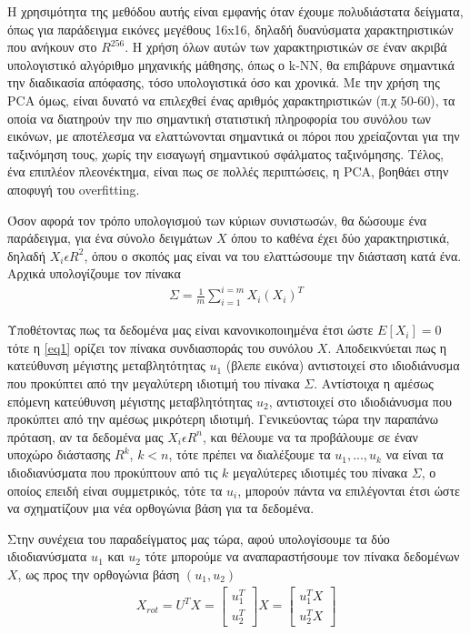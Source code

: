 \documentclass[11pt,a4paper,english,greek,twoside]{../Thesis}
\begin{document}
\par Η χρησιμότητα της μεθόδου αυτής είναι εμφανής όταν έχουμε πολυδιάστατα δείγματα, όπως για παράδειγμα εικόνες  μεγέθους 16x16, δηλαδή δυανύσματα χαρακτηριστικών που ανήκουν στο $R^{256}$. Η χρήση όλων αυτών των χαρακτηριστικών σε έναν ακριβά υπολογιστικό αλγόριθμο μηχανικής μάθησης, όπως ο k-NN, θα επιβάρυνε σημαντικά την διαδικασία απόφασης, τόσο υπολογιστικά όσο και χρονικά. Με την χρήση της PCA όμως, είναι δυνατό να επιλεχθεί ένας αριθμός χαρακτηριστικών (π.χ 50-60), τα οποία να διατηρούν την πιο σημαντική στατιστική πληροφορία του συνόλου των εικόνων, με αποτέλεσμα να ελαττώνονται σημαντικά οι πόροι που χρείαζονται για την ταξινόμηση τους, χωρίς την εισαγωγή σημαντικού σφάλματος ταξινόμησης. Τέλος, ένα επιπλέον πλεονέκτημα, είναι πως σε πολλές περιπτώσεις, η PCA, βοηθάει στην αποφυγή του overfitting.

\par Όσον αφορά τον τρόπο υπολογισμού των κύριων συνιστωσών, θα δώσουμε ένα παράδειγμα, για ένα σύνολο δειγμάτων $X$ όπου το καθένα έχει δύο χαρακτηριστικά, δηλαδή $X_i \epsilon R^2$, όπου ο σκοπός μας είναι να του ελαττώσουμε την διάσταση κατά ένα. Αρχικά υπολογίζουμε τον πίνακα 
\begin{align}
\Sigma = \frac{1}{m}\sum_{i=1}^{i=m} X_i(X_i)^T \label{eq1}
\end{align}

\par Υποθέτοντας πως τα δεδομένα μας είναι κανονικοποιημένα έτσι ώστε $E[X_i]=0$ τότε η \eqref{eq1} ορίζει τον πίνακα συνδιασποράς του συνόλου $X$. Αποδεικνύεται πως η κατεύθυνση μέγιστης μεταβλητότητας $u_1$ (βλεπε εικόνα) αντιστοιχεί στο ιδιοδιάνυσμα που προκύπτει από την μεγαλύτερη ιδιοτιμή του πίνακα $\Sigma$. Αντίστοιχα η αμέσως επόμενη κατεύθυνση μέγιστης μεταβλητότητας $u_2$, αντιστοιχεί στο ιδιοδιάνυσμα που προκύπτει από την αμέσως μικρότερη ιδιοτιμή. Γενικεύοντας τώρα την παραπάνω πρόταση, αν τα δεδομένα μας $X_i \epsilon R^n$, και θέλουμε να τα προβάλουμε σε έναν υποχώρο διάστασης $R^k$, $k<n$, τότε πρέπει να διαλέξουμε τα $u_1,...,u_k$ να είναι τα ιδιοδιανύσματα που προκύπτουν από τις $k$ μεγαλύτερες ιδιοτιμές του πίνακα $\Sigma$, ο οποίος επειδή είναι συμμετρικός, τότε τα $u_i$, μπορούν πάντα να επιλέγονται έτσι ώστε να σχηματίζουν μια νέα ορθογώνια βάση για τα δεδομένα.

\par Στην συνέχεια του παραδείγματος μας τώρα, αφού υπολογίσουμε τα δύο ιδιοδιανύσματα $u_1$ και $u_2$ τότε μπορούμε να αναπαραστήσουμε τον πίνακα δεδομένων $X$, ως προς την ορθογώνια βάση $(u_1,u_2)$
\begin{align}
X_{rot} = U^TX =\begin{bmatrix}u_1^T\\u_2^T\end{bmatrix}X= \begin{bmatrix}u_1^TX\\u_2^TX\end{bmatrix}
\label{eq2}
\end{align}
\end{document}
